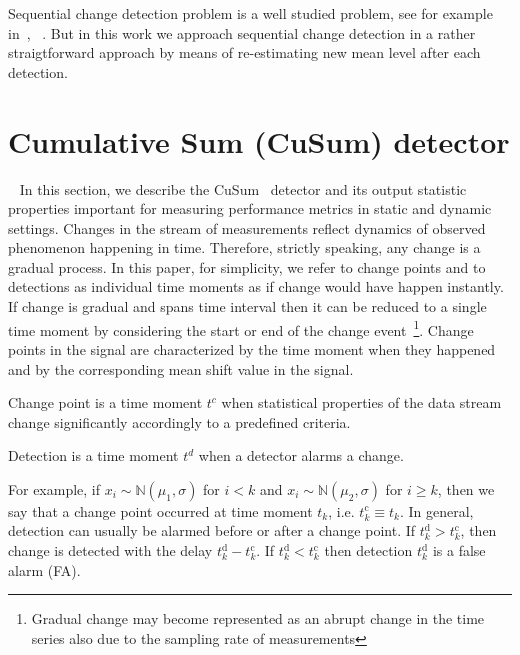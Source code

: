 Sequential change detection problem is a well studied problem, see for example in~\cite{tartakovsky2014sequential}, ~\cite{plasse2021streaming}. But in this work we approach sequential change detection in a rather straigtforward approach by means of re-estimating new mean level after each detection. 


\section{Cumulative Sum (CuSum) detector}~\label{sec:cusum_detector}
In this section, we describe the CuSum~\cite{Page1954} detector and its output statistic properties important for measuring performance metrics in static and dynamic settings.
Changes in the stream of measurements reflect dynamics of observed phenomenon happening in time.
Therefore, strictly speaking, any change is a gradual process.
In this paper, for simplicity, we refer to change points and to detections as individual time moments as if change would have happen instantly. If change is gradual and spans time interval then it can be reduced to a single time moment by considering the start or end of the change event~\footnote{Gradual change may become represented as an abrupt change in the time series also due to the sampling rate of measurements}. 
Change points in the signal are characterized by the time moment when they happened and by the corresponding mean shift value in the signal.
\begin{definition}
  Change point is a time moment $t^c$ when statistical properties of the data stream change significantly accordingly to a predefined criteria.
\end{definition}
\begin{definition}
  Detection is a time moment $t^d$ when a detector alarms a change.
\end{definition}
For example, if $x_i \sim \mathbb{N}(\mu_1, \sigma)$ for $i < k$ and $x_i \sim \mathbb{N}(\mu_2, \sigma)$ for $i \geq k$,
then we say that a change point occurred at time moment $t_k$, i.e. $t^{\text{c}}_{k} \equiv t_k$.
In general, detection can usually be alarmed before or after a change point.
If $t^{\text{d}}_k > t^{\text{c}}_k$, then change is detected with the delay $t^{\text{d}}_k - t^{\text{c}}_k$.
If $t^{\text{d}}_k < t^{\text{c}}_k$ then detection $t^{\text{d}}_k$ is a false alarm (FA).

